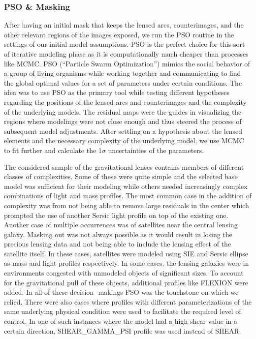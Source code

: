 \documentclass{aa}
\begin{document}
\subsubsection{PSO \& Masking}
After having an initial mask that keeps the lensed arcs, counterimages, and the other relevant regions of the images exposed, we run the PSO routine in the settings of our initial model assumptions. PSO is the perfect choice for this sort of iterative modeling phase as it is computationally much cheaper than processes like MCMC. PSO (“Particle Swarm Optimization”) mimics the social behavior of a group of living organisms while working together and communicating to find the global optimal values for a set of parameters under certain conditions. The idea was to use PSO as the primary tool while testing different hypotheses regarding the positions of the lensed arcs and counterimages and the complexity of the underlying models. The residual maps were the guides in visualizing the regions where modelings were not close enough and thus steered the process of subsequent model adjustments.
 After settling on a hypothesis about the lensed elements and the necessary complexity of the underlying model, we use MCMC to fit further and calculate the 1$\sigma$ uncertainties of the parameters. \par
The considered sample of the gravitational lenses contains members of different classes of complexities. Some of these were quite simple and the selected base model was sufficient for their modeling while others needed increasingly complex combinations of light and mass profiles. 
The most common case in the addition of complexity was from not being able to remove large residuals in the center which prompted the use of another Sersic light profile on top of the existing one. Another case of multiple occurrences was of satellites near the central lensing galaxy. Masking out was not always possible as it would result in losing the precious lensing data and not being able to include the lensing effect of the satellite itself. In these cases, satellites were modeled using SIE and Sersic ellipse as mass and light profiles respectively. In some cases, the lensing galaxies were in environments congested with unmodeled objects of significant sizes. To account for the gravitational pull of these objects, additional profiles like FLEXION were added. In all of these decision -makings PSO was the touchstone on which we relied. There were also cases where profiles with different parameterizations of the same underlying physical condition were used to facilitate the required level of control. In one of such instances where the model had a high shear value in a certain direction, SHEAR\_GAMMA\_PSI profile was used instead of SHEAR.
\end{document}
